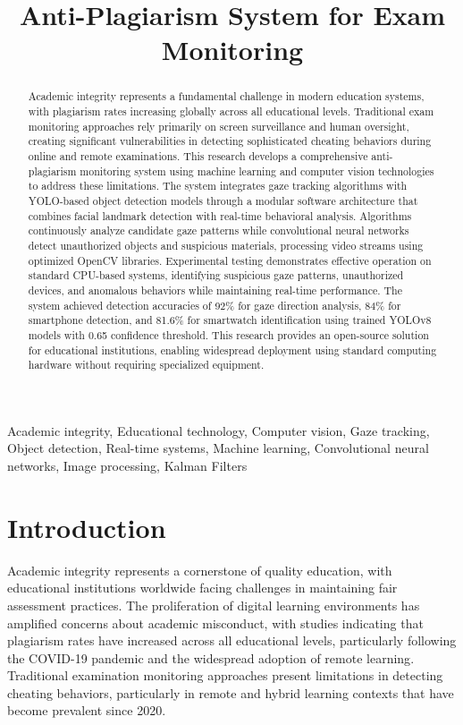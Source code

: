 \documentclass[conference]{IEEEtran}
\title{Anti-Plagiarism System for Exam Monitoring}
\author{
    \IEEEauthorblockN{Valentin Pletea-Marinescu}
    \IEEEauthorblockA{
        \textit{National University of Science and Technology POLITEHNICA Bucharest}\\
        Email: \texttt{pletea.valentin2003@gmail.com}
    }
}
\begin{document}
\maketitle

\begin{abstract}
Academic integrity represents a fundamental challenge in modern education systems, 
with plagiarism rates increasing globally across all educational levels. Traditional 
exam monitoring approaches rely primarily on screen surveillance and human oversight, 
creating significant vulnerabilities in detecting sophisticated cheating behaviors 
during online and remote examinations.
This research develops a comprehensive anti-plagiarism monitoring system using 
machine learning and computer vision technologies to address these limitations. 
The system integrates gaze tracking algorithms with YOLO-based object detection 
models through a modular software architecture that combines facial landmark 
detection with real-time behavioral analysis. Algorithms continuously analyze 
candidate gaze patterns while convolutional neural networks detect unauthorized objects 
and suspicious materials, processing video streams using optimized OpenCV libraries.
Experimental testing demonstrates effective operation on standard CPU-based 
systems, identifying suspicious gaze patterns, unauthorized devices, 
and anomalous behaviors while maintaining real-time performance. The system 
achieved detection accuracies of 92\% for gaze direction analysis, 84\% for smartphone detection, and 81.6\% for smartwatch identification using trained YOLOv8 models with 0.65 confidence threshold. This research 
provides an open-source solution for educational institutions, enabling 
widespread deployment using standard computing hardware without requiring specialized equipment.
\end{abstract}

\begin{IEEEkeywords}
Academic integrity, Educational technology, Computer vision, Gaze tracking, Object detection, Real-time systems, Machine learning, Convolutional neural networks, Image processing, Kalman Filters
\end{IEEEkeywords}

\section{Introduction}

Academic integrity represents a cornerstone of quality education, with educational 
institutions worldwide facing challenges in maintaining fair assessment 
practices. The proliferation of digital learning environments has amplified concerns 
about academic misconduct, with studies indicating that plagiarism rates have increased 
across all educational levels, particularly following the COVID-19 pandemic and the 
widespread adoption of remote learning\cite{updated_pandemic_reference}. Traditional 
examination monitoring approaches present limitations 
in detecting cheating behaviors, particularly in remote and hybrid 
learning contexts that have become prevalent since 2020\cite{updated_hybrid_learning}.
\end{document}
